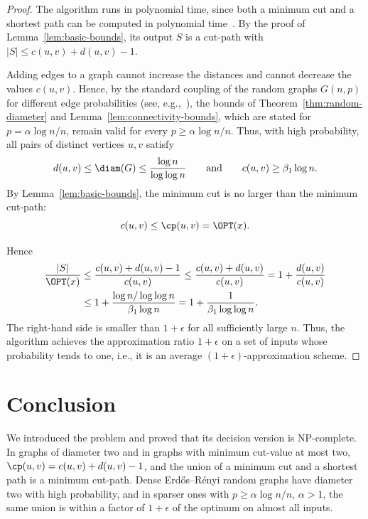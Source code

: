 \begin{proof}
The algorithm runs in polynomial time, since both a minimum cut and a shortest path can be computed in polynomial time~\cite{Cormen2022}.
By the proof of Lemma~\ref{lem:basic-bounds}, its output $S$ is a cut-path with $|S| \leq c(u,v) + d(u,v) - 1$.

Adding edges to a graph cannot increase the distances and cannot decrease the values $c(u,v)$.
Hence, by the standard coupling of the random graphs $G(n,p)$ for different edge probabilities (see, e.g.,~\cite{Frieze2016}), the bounds of Theorem~\ref{thm:random-diameter} and Lemma~\ref{lem:connectivity-bounds}, which are stated for $p = \alpha \log n / n$, remain valid for every $p \geq \alpha \log n / n$.
Thus, with high probability, all pairs of distinct vertices $u,v$ satisfy
\[
d(u,v) \leq \diam(G) \leq \frac{\log n}{\log \log n}
\qquad\text{and}\qquad
c(u,v) \geq \beta_1 \log n.
\]
By Lemma~\ref{lem:basic-bounds}, the minimum cut is no larger than the minimum cut-path:
\[
c(u,v) \leq \cp(u,v) = \OPT(x).
\]

Hence
\begin{align*}
\frac{|S|}{\OPT(x)} &\leq \frac{c(u,v)+d(u,v)-1}{c(u,v)} \leq \frac{c(u,v)+d(u,v)}{c(u,v)} = 1 + \frac{d(u,v)}{c(u,v)}\\
&\leq 1+\frac{\log n / \log \log n}{\beta_1 \log n} = 1 + \frac{1}{\beta_1 \log \log n}.
\end{align*}
The right-hand side is smaller than $1+\epsilon$ for all sufficiently large $n$.
Thus, the algorithm achieves the approximation ratio $1+\epsilon$ on a set of inputs whose probability tends to one, i.e., it is an average $(1+\epsilon)$-approximation scheme.
\end{proof}

\section{Conclusion}
\label{sec:conclusion}

We introduced the \MinCutPath{} problem and proved that its decision version is NP-complete.
In graphs of diameter two and in graphs with minimum cut-value at most two, $\cp(u, v) = c(u, v) + d(u, v) - 1$, and the union of a minimum cut and a shortest path is a minimum cut-path.
Dense Erdős–Rényi random graphs have diameter two with high probability, and in sparser ones with $p \geq \alpha \log n / n$, $\alpha > 1$, the same union is within a factor of $1+\epsilon$ of the optimum on almost all inputs.


